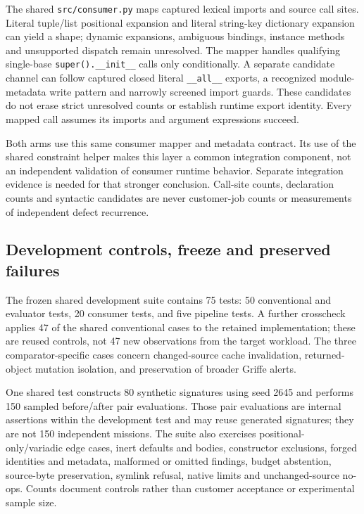 The shared \texttt{src/consumer.py} maps captured lexical imports and source
call sites. Literal tuple/list positional expansion and literal string-key
dictionary expansion can yield a shape; dynamic expansions, ambiguous
bindings, instance methods and unsupported dispatch remain unresolved.
The mapper handles qualifying single-base \texttt{super().\_\_init\_\_}
calls only conditionally. A separate candidate channel can follow captured
closed literal \texttt{\_\_all\_\_} exports, a recognized module-metadata
write pattern and narrowly screened import guards. These candidates do not
erase strict unresolved counts or establish runtime export identity.
Every mapped call assumes its imports and argument expressions succeed.

Both arms use this same consumer mapper and metadata contract. Its use of
the shared constraint helper makes this layer a common integration
component, not an independent validation of consumer runtime behavior.
Separate integration evidence is needed for that stronger conclusion.
Call-site counts, declaration counts and syntactic candidates are never
customer-job counts or measurements of independent defect recurrence.

\subsection{Development controls, freeze and preserved failures}

The frozen shared development suite contains 75 tests: 50 conventional and
evaluator tests, 20 consumer tests, and five pipeline tests. A further
crosscheck applies 47 of the shared conventional cases to the retained
implementation; these are reused controls, not 47 new observations from the
target workload. The three comparator-specific cases concern changed-source
cache invalidation, returned-object mutation isolation, and preservation of
broader Griffe alerts.

One shared test constructs 80 synthetic signatures using seed 2645 and
performs 150 sampled before/after pair evaluations. Those pair evaluations
are internal assertions within the development test and may reuse generated
signatures; they are not 150 independent missions. The suite also exercises
positional-only/variadic edge cases, inert defaults and bodies, constructor
exclusions, forged identities and metadata, malformed or omitted findings,
budget abstention, source-byte preservation, symlink refusal, native limits
and unchanged-source no-ops. Counts document controls rather than customer
acceptance or experimental sample size.

